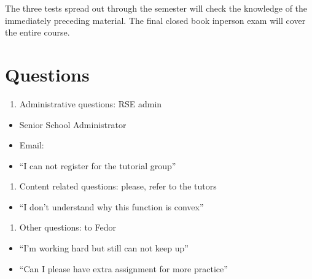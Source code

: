 \documentclass[letterpaper,10pt,english]{jupyterBook}
\begin{document}
\sphinxAtStartPar
The three tests spread out through the semester will check the knowledge of the immediately preceding material. The final closed book in\sphinxhyphen{}person exam will cover the entire course.


\section{Questions}
\label{\detokenize{01.introduction:questions}}\begin{enumerate}
%
\item {} 
\sphinxAtStartPar
Administrative questions: RSE admin

\end{enumerate}
\begin{itemize}
\item {} 
\sphinxAtStartPar
{} Senior School Administrator

\item {} 
\sphinxAtStartPar
Email: 

\item {} 
\sphinxAtStartPar
“I can not register for the tutorial group”

\end{itemize}
\begin{enumerate}
%
\setcounter{enumi}{1}
\item {} 
\sphinxAtStartPar
Content related questions: please, refer to the tutors

\end{enumerate}
\begin{itemize}
\item {} 
\sphinxAtStartPar
“I don’t understand why this function is convex”

\end{itemize}
\begin{enumerate}
%
\setcounter{enumi}{2}
\item {} 
\sphinxAtStartPar
Other questions: to Fedor

\end{enumerate}
\begin{itemize}
\item {} 
\sphinxAtStartPar
“I’m working hard but still can not keep up”

\item {} 
\sphinxAtStartPar
“Can I please have extra assignment for more practice”

\end{itemize}
\end{document}
